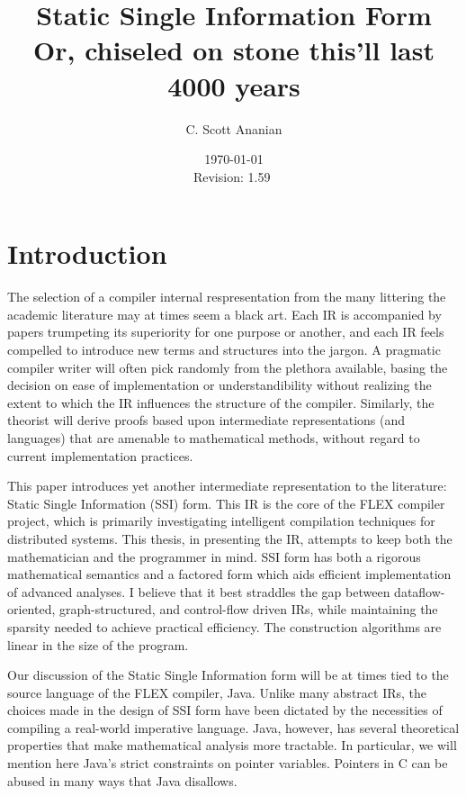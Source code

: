 \documentclass[12pt,titlepage,twoside]{article}
\title{Static Single Information Form\\
\small Or, chiseled on stone this'll last 4000 years}
\author{C. Scott Ananian}
\date{\today \\ $ $Revision: 1.59 $ $}
\let\oldsection\section
\renewcommand{\section}{\setcounter{figure}{0}\oldsection}
\begin{document}


\pagestyle{empty}
\maketitle\cleardoublepage
\pagestyle{myheadings}
\tableofcontents\listoffigures\listofalgorithms\cleardoublepage
{}

\section{Introduction}
The selection of a compiler internal respresentation from the many
littering the academic literature may at times seem a black art.  Each
IR is accompanied by papers trumpeting its superiority for one purpose
or another, and each IR feels compelled to introduce new terms and
structures into the jargon.  A pragmatic compiler writer will often
pick randomly from the plethora available, basing the decision on ease
of implementation or understandibility without realizing the extent to
which the IR influences the structure of the compiler.  Similarly, the
theorist will derive proofs based upon intermediate representations
(and languages) that are amenable to mathematical methods, without
regard to current implementation practices.%

This paper introduces yet another intermediate
representation to the literature:  Static Single Information (SSI) form.
This IR is the core of the FLEX compiler project, which is primarily
investigating intelligent compilation techniques for distributed
systems.  This thesis, in presenting the IR,
attempts to keep both the mathematician and the programmer in mind.  
SSI form has both a rigorous mathematical semantics and a factored
form which aids efficient implementation of advanced analyses.
I believe that it best straddles the gap between dataflow-oriented,
graph-structured, and control-flow driven IRs, while maintaining the
sparsity needed to achieve practical efficiency.  The construction
algorithms are linear in the size of the program.

Our discussion of the Static Single Information form will be at times
tied to the source language of the FLEX compiler, Java.  Unlike many
abstract IRs, the choices made in the design of SSI form have been
dictated by the necessities of compiling a real-world imperative
language.  Java, however, has several theoretical properties that make
mathematical analysis more tractable.  In particular, we
will mention here Java's strict constraints on pointer variables.
Pointers in C can be abused in many ways that Java disallows.
\end{document}
